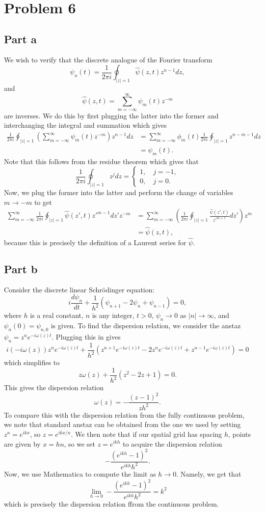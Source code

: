 \documentclass{article}
\begin{document}
\section{Problem 6}
\subsection{Part a}
We wish to verify that the discrete analogue of the Fourier transform
$$
\psi_n(t)=\frac{1}{2\pi i}\oint_{|z|=1} \hat{\psi}(z,t) z^{n-1} dz,
$$
and
$$
\hat{\psi}(z,t)=\sum_{m=-\infty}^\infty \psi_m(t) z^{-m}
$$
are inverses. We do this by first plugging the latter into the former and interchanging the integral and summation which gives
\begin{align*}
\frac{1}{2\pi i}\oint_{|z|=1}\left(\sum_{m=-\infty}^\infty \psi_m(t) z^{-m}\right)z^{n-1}dz&=
\sum_{m=-\infty}^\infty\phi_m(t)\frac{1}{2\pi i}\oint_{|z|=1}z^{n-m-1}dz\\&=
\psi_m(t).
\end{align*}  
Note that this follows from the residue theorem which gives that
\[
\frac{1}{2\pi i}\oint_{|z|=1}z^{j}dz=\begin{cases}
	1, \quad j=-1,\\
	0, \quad j=0.
\end{cases}
\]
Now, we plug the former into the latter and perform the change of variables $m\to-m$ to get
\begin{align*}
\sum_{m=-\infty}^\infty \frac{1}{2\pi i}\oint_{|z|=1} \hat{\psi}(z',t) z'^{m-1} dz' z^{-m}&=\sum_{m=-\infty}^\infty \left(\frac{1}{2\pi i}\oint_{|z|=1} \frac{\hat{\psi}(z',t)}{z'^{m+1}} dz'\right) z^{m}\\&=
\hat{\psi}(z,t),
\end{align*}
because this is precisely the definition of a Laurent series for $\hat{\psi}$.
\subsection{Part b}
Consider the discrete linear
Schr\"odinger equation:
$$
i\frac{d\psi_n}{dt}+\frac{1}{h^2}(\psi_{n+1}-2 \psi_n+\psi_{n-1})=0,
$$
where $h$ is a real constant, $n$ is any integer, $t>0$, $\psi_n\rightarrow 0$
as $|n|\rightarrow \infty$, and $\psi_n(0)=\psi_{n,0}$ is given. To find the dispersion relation, we consider the anstaz $\psi_n=z^n e^{-i \omega(z) t}$. Plugging this in gives
\[
i(-i\omega(z))z^n e^{-i \omega(z) t}+\frac{1}{h^2}(z^{n+1} e^{-i \omega(z) t}-2z^n e^{-i \omega(z) t}+z^{n-1} e^{-i \omega(z) t})=0
\]
which simplifies to
\[
z\omega(z)+\frac{1}{h^2}(z^2-2z+1)=0.
\]
This gives the dispersion relation
\[
\omega(z)=-\frac{(z-1)^2}{zh^2}.
\]
To compare this with the dispersion relation from the fully continuous problem, we note that standard anstaz can be obtained from the one we used by setting $z^n=e^{ikx}$, so $z=e^{ikx/n}$. We then note that if our spatial grid has spacing $h$, points are given by $x=hn$, so we set $z=e^{ikh}$ to acquire the dispersion relation
\[
-\frac{(e^{ikh}-1)^2}{e^{ikh}h^2}.
\] 
Now, we use Mathematica to compute the limit as $h\to0$. Namely, we get that 
\[
\lim_{h\to0}-\frac{(e^{ikh}-1)^2}{e^{ikh}h^2}=k^2
\]
which is precisely the dispersion relation ffrom the continuous problem. 
\end{document}
